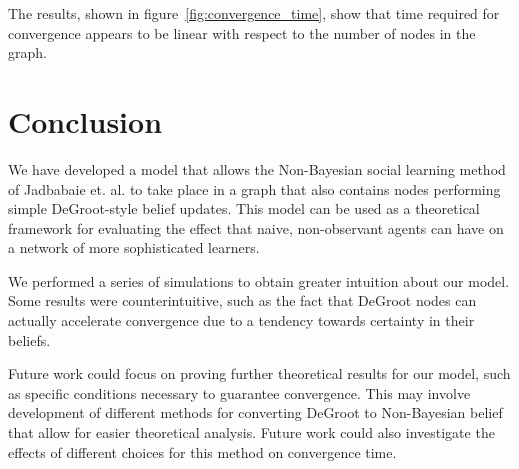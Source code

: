 \documentclass[letterpaper, 10pt, conference]{ieeeconf}
\begin{document}
The results, shown in figure~\ref{fig:convergence_time}, show that time required for convergence appears to be linear with respect to the number of nodes in the graph.

\section{Conclusion}

We have developed a model that allows the Non-Bayesian social learning method of Jadbabaie et. al. to take place in a graph that also contains nodes performing simple DeGroot-style belief updates.  This model can be used as a theoretical framework for evaluating the effect that naive, non-observant agents can have on a network of more sophisticated learners.

We performed a series of simulations to obtain greater intuition about our model.  Some results were counterintuitive, such as the fact that DeGroot nodes can actually accelerate convergence due to a tendency towards certainty in their beliefs.

Future work could focus on proving further theoretical results for our model, such as specific conditions necessary to guarantee convergence.  This may involve development of different methods for converting DeGroot to Non-Bayesian belief that allow for easier theoretical analysis.  Future work could also investigate the effects of different choices for this method on convergence time.



\end{document}
